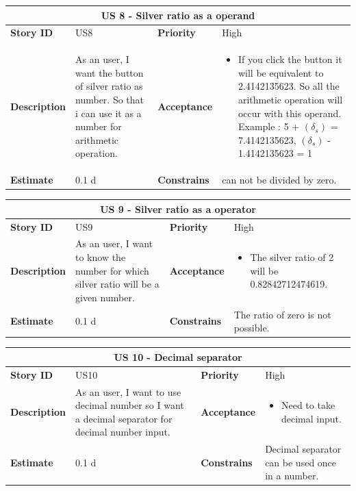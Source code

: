 \documentclass{article}
\begin{document}
\begin{tabular}{ |p{2cm}|p{5cm}|p{2cm}|p{4cm}| }
 \hline
 \multicolumn{4}{|c|}{US 8 - Silver ratio as a operand} \\
 \hline
 \textbf {Story ID}& US8 &  \textbf{Priority} & High \\
 \hline
  \textbf{Description}   & As an user, I want the button of silver ratio as number. So that i can use it as a number for arithmetic operation. &    \textbf{Acceptance}& 
\begin{itemize}
\item  If you click the button it will be equivalent to 2.4142135623. So all the arithmetic operation will occur with this operand. Example : 5 + $(\delta_s)$ = 7.4142135623, $(\delta_s)$ - 1.4142135623 = 1
\end{itemize}
  \\
 \hline
 \textbf{Estimate} & 0.1 d &  \textbf{Constrains}&  can not be divided by zero.  \\
 \hline
\end{tabular}

\begin{tabular}{ |p{2cm}|p{5cm}|p{2cm}|p{4cm}| }
 \hline
 \multicolumn{4}{|c|}{US 9 - Silver ratio as a operator} \\
 \hline
 \textbf {Story ID}& US9 &  \textbf{Priority} & High \\
 \hline
  \textbf{Description}   & As an user, I want to know the number for which silver ratio will be a given number. &    \textbf{Acceptance}& 
\begin{itemize}
\item  The silver ratio of 2 will be 0.82842712474619.
\end{itemize}
  \\
 \hline
 \textbf{Estimate} & 0.1 d &  \textbf{Constrains}&  The ratio of zero is not possible.  \\
 \hline
\end{tabular}

\begin{tabular}{ |p{2cm}|p{5cm}|p{2cm}|p{4cm}| }
 \hline
 \multicolumn{4}{|c|}{US 10 -  Decimal separator} \\
 \hline
 \textbf {Story ID}& US10 &  \textbf{Priority} & High \\
 \hline
  \textbf{Description}   & As an user, I want to use decimal number so I want a decimal separator for decimal number input. &    \textbf{Acceptance}& 
\begin{itemize}
\item  Need to take decimal input.
\end{itemize}
  \\
 \hline
 \textbf{Estimate} & 0.1 d &  \textbf{Constrains}&  Decimal separator can be used once in a number.  \\
 \hline
\end{tabular}
\end{document}
